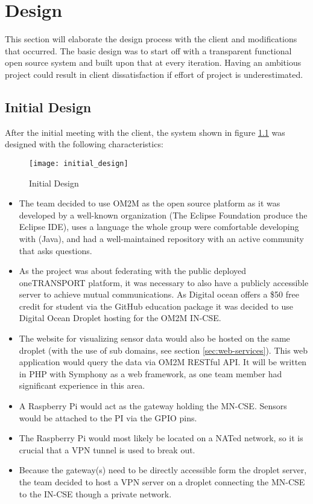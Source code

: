 \chapter{Design}

This section will elaborate the design process with the client and modifications that occurred. The basic design was to start off with a transparent functional open source system and built upon that at every iteration. Having an ambitious project could result in client dissatisfaction if effort of project is underestimated.      

\section{Initial Design} 

After the initial meeting with the client, the system shown in figure \ref{intial-design} was designed with the following characteristics:

\begin{figure}[H]
  \centering
  \texttt{[image: initial\_design]}
  \caption{Initial Design}
  \label{intial-design}
\end{figure}

\begin{itemize}
  \item The team decided to use OM2M as the open source platform as it was developed by a well-known organization (The Eclipse Foundation produce the Eclipse IDE), uses a language the whole group were comfortable developing with (Java), and had a well-maintained repository with an active community that asks questions.
  \item As the project was about federating with the public deployed oneTRANSPORT platform, it was necessary to also have a publicly accessible server to achieve mutual communications. As Digital ocean offers a \$50 free credit for student via the GitHub education package it was decided to use Digital Ocean Droplet hosting for the OM2M IN-CSE. 
  \item The website for visualizing sensor data would also be hosted on the same droplet (with the use of sub domains, see section \ref{sec:web-services}). This web application would query the data via OM2M RESTful API. It will be written in PHP with Symphony as a web framework, as one team member had significant experience in this area.  
  \item A Raspberry Pi would act as the gateway holding the MN-CSE. Sensors would be attached to the PI via the GPIO pins.
  \item The Raspberry Pi would most likely be located on a NATed network, so it is crucial that a VPN tunnel is used to break out.
  \item Because the gateway(s) need to be directly accessible form the droplet server, the team decided to host a VPN server on a droplet connecting the MN-CSE to the IN-CSE though a private network. 
\end{itemize}

